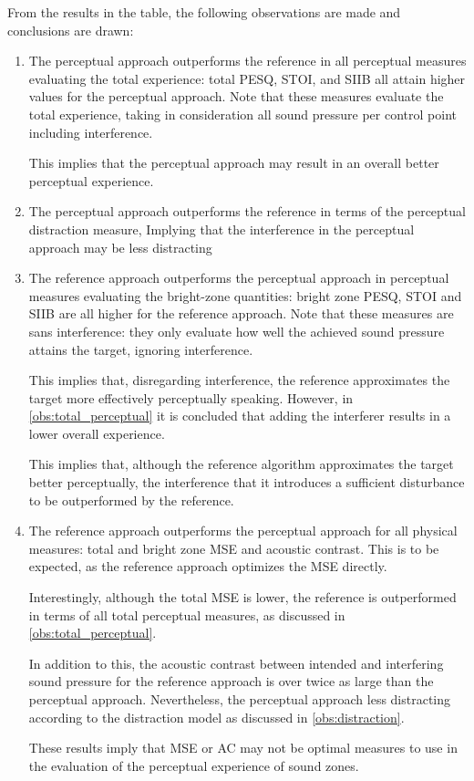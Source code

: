 From the results in the table, the following observations are made and conclusions are drawn:
\begin{enumerate}
    \item The perceptual approach outperforms the reference in all perceptual measures evaluating the total experience:
        total PESQ, STOI, and SIIB all attain higher values for the perceptual approach.
        Note that these measures evaluate the total experience, taking in consideration all sound pressure per control 
        point including interference.

        This implies that the perceptual approach may result in an overall better perceptual experience.
        \label{obs:total_perceptual}

    \item The perceptual approach outperforms the reference in terms of the perceptual distraction measure,
        Implying that the interference in the perceptual approach may be less distracting 
        \label{obs:distraction}

    \item The reference approach outperforms the perceptual approach in perceptual measures evaluating the 
        bright-zone quantities: bright zone PESQ, STOI and SIIB are all higher for the reference approach.
        Note that these measures are sans interference: they only evaluate how well the achieved sound pressure
        attains the target, ignoring interference.

        This implies that, disregarding interference, the reference approximates the target more effectively 
        perceptually speaking.
        However, in \autoref{obs:total_perceptual} it is concluded that adding the interferer results in a 
        lower overall experience.

        This implies that, although the reference algorithm approximates the target better perceptually, 
        the interference that it introduces a sufficient disturbance to be outperformed by the reference.
        \label{obs:bright_zone_perceptual}

    \item The reference approach outperforms the perceptual approach for all physical measures: 
        total and bright zone MSE and acoustic contrast.
        This is to be expected, as the reference approach optimizes the MSE directly.

        Interestingly, although the total MSE is lower, the reference is outperformed in terms of all total perceptual 
        measures, as discussed in \autoref{obs:total_perceptual}.

        In addition to this, the acoustic contrast between intended and interfering sound pressure for 
        the reference approach is over twice as large than the perceptual approach.
        Nevertheless, the perceptual approach less distracting according to the distraction model as 
        discussed in \autoref{obs:distraction}.

        These results imply that MSE or AC may not be optimal measures to use in the evaluation of the  
        perceptual experience of sound zones.
        \label{obs:physical}
\end{enumerate}

